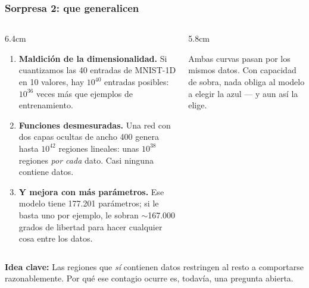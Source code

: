 \documentclass[aspectratio=169, 10pt]{beamer}
\newcommand{\idea}[1]{%
	\begin{tcolorbox}[colback=AccentGreen!6, colframe=AccentGreen, arc=3pt,
		width=\textwidth, boxsep=1pt, left=5pt, right=5pt, top=2pt, bottom=2pt,
		fontupper=\small]
		\RaggedRight\textbf{Idea clave:} #1
	\end{tcolorbox}
}
\newcommand{\fuente}[1]{{\scriptsize\color{StanfordGray}#1}}
\begin{document}
\begin{frame}
\frametitle{Sorpresa 2: que generalicen}
\footnotesize %
\begin{columns}[T]
\begin{column}{6.4cm}
\begin{enumerate}
	\item \textbf{Maldici\'on de la dimensionalidad.} Si cuantizamos las 40 entradas de MNIST-1D en 10 valores, hay $10^{40}$ entradas posibles: $10^{36}$ veces m\'as que ejemplos de entrenamiento.
	\item \textbf{Funciones desmesuradas.} Una red con dos capas ocultas de ancho 400 genera hasta $10^{42}$ regiones lineales: unas $10^{38}$ regiones \emph{por cada} dato. Casi ninguna contiene datos.
	\item \textbf{Y mejora con m\'as par\'ametros.} Ese modelo tiene 177.201 par\'ametros; si le basta uno por ejemplo, le sobran $\sim$167.000 grados de libertad para hacer cualquier cosa entre los datos.
\end{enumerate}
\end{column}
\begin{column}{5.8cm}
\begin{center}
\end{center}
\vspace{-0.3em}
\fuente{Ambas curvas pasan por los mismos datos. Con capacidad de sobra, nada obliga al modelo a elegir la azul --- y aun as\'i la elige.}
\end{column}
\end{columns}
\vspace{0.2em}
\idea{Las regiones que \emph{s\'i} contienen datos restringen al resto a comportarse razonablemente. Por qu\'e ese contagio ocurre es, todav\'ia, una pregunta abierta.}
\end{frame}
\end{document}
